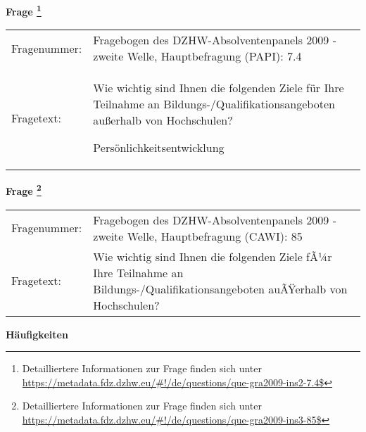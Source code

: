 				\vspace*{0.5cm}
                \noindent\textbf{Frage
	                \footnote{Detailliertere Informationen zur Frage finden sich unter
		              \url{https://metadata.fdz.dzhw.eu/\#!/de/questions/que-gra2009-ins2-7.4$}}}\\
				\begin{tabularx}{\hsize}{@{}lX}
					Fragenummer: &
					  Fragebogen des DZHW-Absolventenpanels 2009 - zweite Welle, Hauptbefragung (PAPI):
					  7.4
 \\
					Fragetext: & Wie wichtig sind Ihnen die folgenden Ziele für Ihre Teilnahme an Bildungs-/Qualifikationsangeboten außerhalb von Hochschulen?\par  Persönlichkeitsentwicklung \\
				\end{tabularx}
				\vspace*{0.5cm}
                \noindent\textbf{Frage
	                \footnote{Detailliertere Informationen zur Frage finden sich unter
		              \url{https://metadata.fdz.dzhw.eu/\#!/de/questions/que-gra2009-ins3-85$}}}\\
				\begin{tabularx}{\hsize}{@{}lX}
					Fragenummer: &
					  Fragebogen des DZHW-Absolventenpanels 2009 - zweite Welle, Hauptbefragung (CAWI):
					  85
 \\
					Fragetext: & Wie wichtig sind Ihnen die folgenden Ziele fÃ¼r Ihre Teilnahme an Bildungs-/Qualifikationsangeboten auÃŸerhalb von Hochschulen? \\
				\end{tabularx}





        		\vspace*{0.5cm}
                \noindent\textbf{Häufigkeiten}

